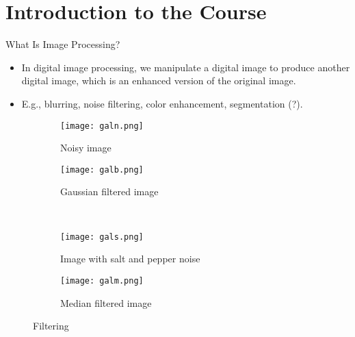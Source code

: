 \section{Introduction to the Course}
\begin{frame}{What Is Image Processing?}
    \begin{itemize}%
        \item In digital image processing, we manipulate a digital image to produce another digital image, which is an enhanced version of the original image.
        \item E.g., blurring, noise filtering, color enhancement, segmentation (?).
    \end{itemize}

    \begin{figure}[ht]
      \centering
      \begin{subfigure}[b]{0.5\linewidth}
        \centering\texttt{[image: galn.png]}
        \caption{Noisy image}\label{sf:galn}
      \end{subfigure}%
      \begin{subfigure}[b]{0.5\linewidth}
        \centering\texttt{[image: galb.png]}
        \caption{Gaussian filtered image}\label{sf:galb}
      \end{subfigure}\\
      \begin{subfigure}[b]{0.5\linewidth}
        \centering\texttt{[image: gals.png]}
        \caption{Image with salt and pepper noise}\label{sf:gals}
      \end{subfigure}%
      \begin{subfigure}[b]{0.5\linewidth}
        \centering\texttt{[image: galm.png]}
        \caption{Median filtered image}\label{sf:galm}
      \end{subfigure}
      \caption{Filtering}
    \end{figure}
\end{frame}


